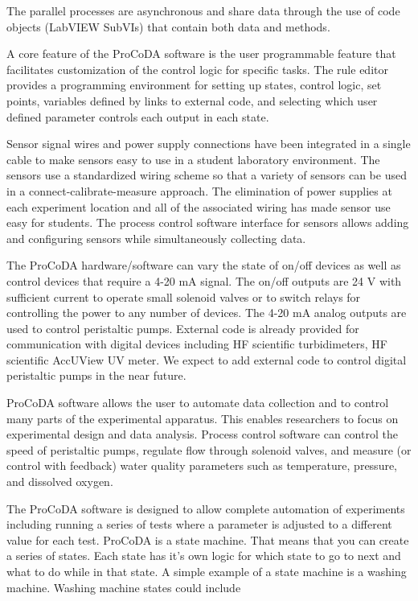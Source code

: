 \documentclass[letterpaper,10pt,english]{sphinxmanual}
\begin{document}
The parallel processes are asynchronous and share data through the use of code objects (LabVIEW SubVIs) that contain both data and methods.

A core feature of the ProCoDA software is the user programmable feature that facilitates customization of the control logic for specific tasks. The rule editor provides a programming environment for setting up states, control logic, set points, variables defined by links to external code, and selecting which user defined parameter controls each output in each state.

Sensor signal wires and power supply connections have been integrated in a single cable to make sensors easy to use in a student laboratory environment. The sensors use a standardized wiring scheme so that a variety of sensors can be used in a connect-calibrate-measure approach. The elimination of power supplies at each experiment location and all of the associated wiring has made sensor use easy for students. The process control software interface for sensors allows adding and configuring sensors while simultaneously collecting data.

The ProCoDA hardware/software can vary the state of on/off devices as well as control devices that require a 4-20 mA signal. The on/off outputs are 24 V with sufficient current to operate small solenoid valves or to switch relays for controlling the power to any number of devices. The 4-20 mA analog outputs are used to control peristaltic pumps. External code is already provided for communication with digital devices including HF scientific turbidimeters, HF scientific AccUView UV meter. We expect to add external code to control digital peristaltic pumps in the near future.

ProCoDA software allows the user to automate data collection and to control many parts of the experimental apparatus. This enables researchers to focus on experimental design and data analysis. Process control software can control the speed of peristaltic pumps, regulate flow through solenoid valves, and measure (or control with feedback) water quality parameters such as temperature, pressure, and dissolved oxygen.

The ProCoDA software is designed to allow complete automation of experiments including running a series of tests where a parameter is adjusted to a different value for each test. ProCoDA is a state machine. That means that you can create a series of states. Each state has it’s own logic for which state to go to next and what to do while in that state. A simple example of a state machine is a washing machine. Washing machine states could include
\end{document}
